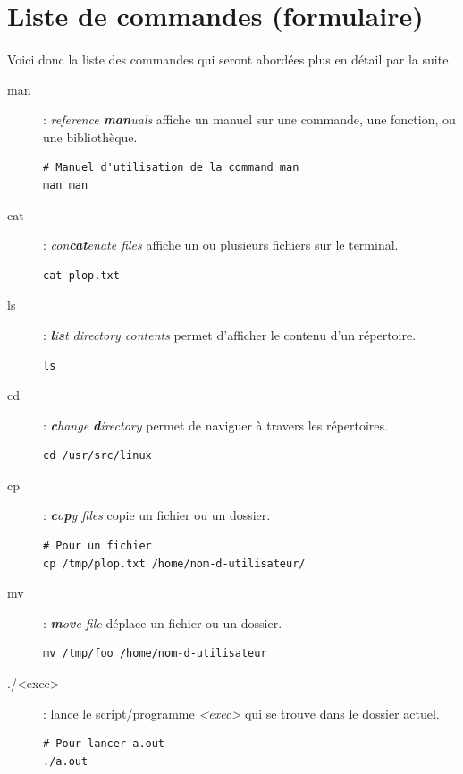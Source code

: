 \documentclass[french, a4paper, 12pt, titlepage]{article}
\begin{document}
\section{Liste de commandes (formulaire)}

\paragraph{} Voici donc la liste des commandes qui seront abordées plus en
détail par la suite.

\begin{description}
\item[man]: \emph{reference \textbf{man}uals} affiche un manuel sur une
	commande, une fonction, ou une bibliothèque.

  \begin{lstlisting}
# Manuel d'utilisation de la command man
man man
  \end{lstlisting}

\item[cat]: \emph{con\textbf{cat}enate files} affiche un ou plusieurs fichiers
	sur le terminal.

  \begin{lstlisting}
cat plop.txt
  \end{lstlisting}

\item[ls]: \emph{\textbf{l}i\textbf{s}t directory contents} permet d'afficher
	le contenu d'un répertoire.

  \begin{lstlisting}
ls
  \end{lstlisting}

\item[cd]: \emph{\textbf{c}hange \textbf{d}irectory} permet de naviguer à
	travers les répertoires.

  \begin{lstlisting}
cd /usr/src/linux
  \end{lstlisting}

\item[cp]: \emph{\textbf{c}o\textbf{p}y files} copie un fichier ou un dossier.

  \begin{lstlisting}
# Pour un fichier
cp /tmp/plop.txt /home/nom-d-utilisateur/
  \end{lstlisting}

\item[mv]: \emph{\textbf{m}o\textbf{v}e file} déplace un fichier ou un dossier.

  \begin{lstlisting}
mv /tmp/foo /home/nom-d-utilisateur
  \end{lstlisting}

\item[./<exec>]: lance le script/programme \emph{<exec>} qui se trouve dans le
	dossier actuel.

  \begin{lstlisting}
# Pour lancer a.out
./a.out
  \end{lstlisting}

\end{description}
\end{document}
